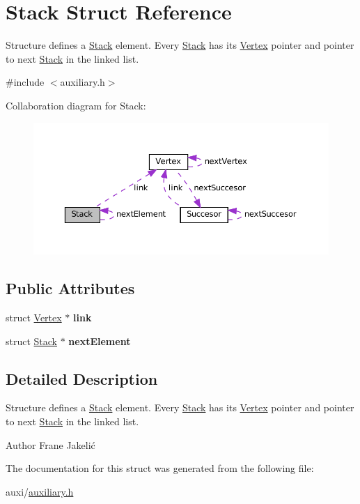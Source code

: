 \hypertarget{structStack}{}\section{Stack Struct Reference}
\label{structStack}


Structure defines a \hyperlink{structStack}{Stack} element. Every \hyperlink{structStack}{Stack} has its \hyperlink{structVertex}{Vertex} pointer and pointer to next \hyperlink{structStack}{Stack} in the linked list.  




{\ttfamily \#include $<$auxiliary.\+h$>$}



Collaboration diagram for Stack\+:\nopagebreak
\begin{figure}[H]
\begin{center}
\leavevmode
\includegraphics[width=350pt]{structStack__coll__graph}
\end{center}
\end{figure}
\subsection*{Public Attributes}
\begin{DoxyCompactItemize}
\item 
\mbox{\label{structStack_a43d3c898634c37822760412ce6a6bf63}} 
struct \hyperlink{structVertex}{Vertex} $\ast$ {\bfseries link}
\item 
\mbox{\label{structStack_a4313db71619d2c5f65f7f205075c3a57}} 
struct \hyperlink{structStack}{Stack} $\ast$ {\bfseries next\+Element}
\end{DoxyCompactItemize}


\subsection{Detailed Description}
Structure defines a \hyperlink{structStack}{Stack} element. Every \hyperlink{structStack}{Stack} has its \hyperlink{structVertex}{Vertex} pointer and pointer to next \hyperlink{structStack}{Stack} in the linked list. 

\begin{DoxyAuthor}{Author}
Frane Jakelić 
\end{DoxyAuthor}


The documentation for this struct was generated from the following file\+:\begin{DoxyCompactItemize}
\item 
auxi/\hyperlink{auxiliary_8h}{auxiliary.\+h}\end{DoxyCompactItemize}
